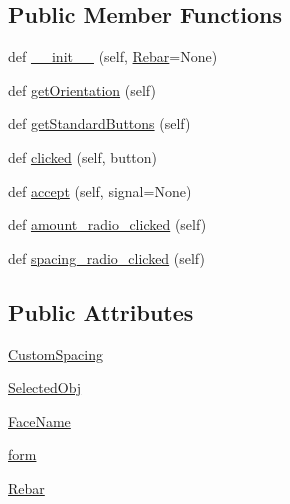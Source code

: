 \subsection*{Public Member Functions}
\begin{DoxyCompactItemize}
\item 
def \hyperlink{classLShapeRebar_1_1__LShapeRebarTaskPanel_af6a5f985af6f167b2817f873aa983cbf}{\+\_\+\+\_\+init\+\_\+\+\_\+} (self, \hyperlink{classLShapeRebar_1_1__LShapeRebarTaskPanel_a4a64ebfb73de83fd42f3a349272e69c7}{Rebar}=None)
\item 
def \hyperlink{classLShapeRebar_1_1__LShapeRebarTaskPanel_a1e13b2224b0ea68b9519c094004087ae}{get\+Orientation} (self)
\item 
def \hyperlink{classLShapeRebar_1_1__LShapeRebarTaskPanel_a8f2f249515b279322dfeeab94cd4395b}{get\+Standard\+Buttons} (self)
\item 
def \hyperlink{classLShapeRebar_1_1__LShapeRebarTaskPanel_ac477e2a29da1e0ac71bf2d3aa1e50c4f}{clicked} (self, button)
\item 
def \hyperlink{classLShapeRebar_1_1__LShapeRebarTaskPanel_a4d62ad224c06875ec721ba9acbdea774}{accept} (self, signal=None)
\item 
def \hyperlink{classLShapeRebar_1_1__LShapeRebarTaskPanel_a81791eac05be58c6df27977089106a0f}{amount\+\_\+radio\+\_\+clicked} (self)
\item 
def \hyperlink{classLShapeRebar_1_1__LShapeRebarTaskPanel_a96a085e4b791b00a372b66ea558c440e}{spacing\+\_\+radio\+\_\+clicked} (self)
\end{DoxyCompactItemize}
\subsection*{Public Attributes}
\begin{DoxyCompactItemize}
\item 
\hyperlink{classLShapeRebar_1_1__LShapeRebarTaskPanel_abfd2b9b6897806fd5d69316ca7f2d687}{Custom\+Spacing}
\item 
\hyperlink{classLShapeRebar_1_1__LShapeRebarTaskPanel_a71f1ee825528164c18315a0234f6da5d}{Selected\+Obj}
\item 
\hyperlink{classLShapeRebar_1_1__LShapeRebarTaskPanel_a8f624818baf68844984b3368f27dc421}{Face\+Name}
\item 
\hyperlink{classLShapeRebar_1_1__LShapeRebarTaskPanel_af6e6f9deafab993e53dabc404d832bef}{form}
\item 
\hyperlink{classLShapeRebar_1_1__LShapeRebarTaskPanel_a4a64ebfb73de83fd42f3a349272e69c7}{Rebar}
\end{DoxyCompactItemize}


